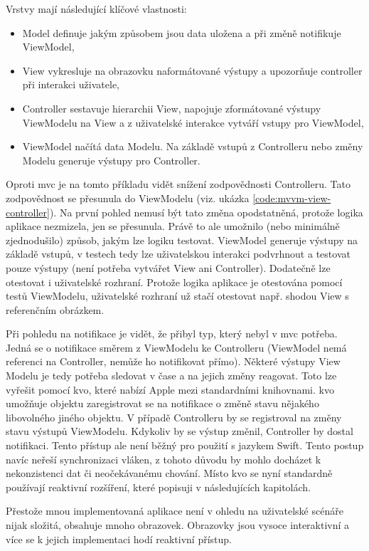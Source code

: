Vrstvy mají následující klíčové vlastnosti:
\begin{itemize}
  \item Model definuje jakým způsobem jsou data uložena a při změně notifikuje ViewModel,
  \item View vykresluje na obrazovku naformátované výstupy a upozorňuje controller při interakci uživatele,
  \item Controller sestavuje hierarchii View, napojuje zformátované výstupy ViewModelu na View a z uživatelské interakce vytváří vstupy pro ViewModel,
  \item ViewModel načítá data Modelu. Na základě vstupů z Controlleru nebo změny Modelu generuje výstupy pro Controller.
\end{itemize}

Oproti \acrshort{mvc} je na tomto příkladu vidět snížení zodpovědnosti Controlleru.
Tato zodpovědnost se přesunula do ViewModelu (viz. ukázka \ref{code:mvvm-view-controller}).
Na první pohled nemusí být tato změna opodstatněná, protože logika aplikace nezmizela, jen se přesunula.
Právě to ale umožnilo (nebo minimálně zjednodušilo) způsob, jakým lze logiku testovat.
ViewModel generuje výstupy na základě vstupů, v testech tedy lze uživatelskou interakci podvrhnout a testovat pouze výstupy (není potřeba vytvářet View ani Controller).
Dodatečně lze otestovat i uživatelské rozhraní.
Protože logika aplikace je otestována pomocí testů ViewModelu, uživatelské rozhraní už stačí otestovat např. shodou View s referenčním obrázkem.


Při pohledu na notifikace je vidět, že přibyl typ, který nebyl v \acrshort{mvc} potřeba.
Jedná se o notifikace směrem z ViewModelu ke Controlleru (ViewModel nemá referenci na Controller, nemůže ho notifikovat přímo).
Některé výstupy View Modelu je tedy potřeba sledovat v čase a na jejich změny reagovat.
Toto lze vyřešit pomocí \acrfull{kvo}, které nabízí Apple mezi standardními knihovnami.
\acrshort{kvo} umožňuje objektu zaregistrovat se na notifikace o změně stavu nějakého libovolného jiného objektu.
V případě Controlleru by se registroval na změny stavu výstupů ViewModelu.
Kdykoliv by se výstup změnil, Controller by dostal notifikaci.
Tento přístup ale není běžný pro použití s jazykem Swift.
Tento postup navíc neřeší synchronizaci vláken, z tohoto důvodu by mohlo docházet k nekonzistenci dat či neočekávanému chování.
Místo \acrshort{kvo} se nyní standardně používají reaktivní rozšíření, které popisuji v následujících kapitolách.

Přestože mnou implementovaná aplikace není v ohledu na uživatelské scénáře nijak složitá, obsahuje mnoho obrazovek.
Obrazovky jsou vysoce interaktivní a více se k jejich implementaci hodí reaktivní přístup.
